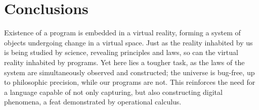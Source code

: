 \documentclass{article}
\begin{document}
     
     \section{Conclusions}
     
     Existence of a program is embedded in a virtual reality, forming a system of objects undergoing change in a virtual space. Just as the reality inhabited by us is being studied by science, revealing principles and laws, so can the virtual reality inhabited by programs. Yet here lies a tougher task, as the laws of the system are simultaneously observed and constructed; the universe is bug-free, up to philosophic precision, while our programs are not. This reinforces the need for a language capable of not only capturing, but also constructing digital phenomena, a feat demonstrated by operational calculus. \cite[Section 8]{OperationalCalculus}
\clearpage
  \printbibliography
  
\end{document}
